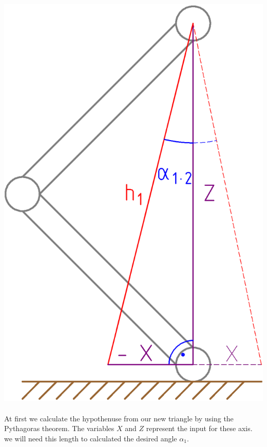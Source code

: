 \documentclass{article}
\begin{document}
    \paragraph{}
    \begin{center}
        \includegraphics[scale=0.2]{x-axis}
    \end{center}
    
    \paragraph{}
    At first we calculate the hypothenuse from our new triangle by using the Pythagoras theorem. The variables $X$ and $Z$ represent the input for these axis. we will need this length to calculated the desired angle $\alpha_1$.
\end{document}
